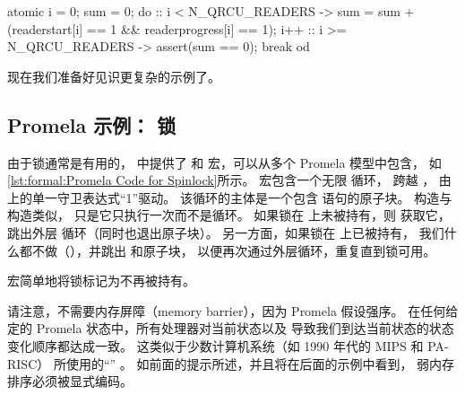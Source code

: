 \begin{listing}
\begin{VerbatimL}
atomic {
	i = 0;
	sum = 0;
	do
	:: i < N_QRCU_READERS ->
		sum = sum + (readerstart[i] == 1 &&
		             readerprogress[i] == 1);
		i++
	:: i >= N_QRCU_READERS ->
		assert(sum == 0);
		break
	od
}
\end{VerbatimL}
\caption{复杂 Promela 断言的原子块}
\label{lst:formal:Atomic Block for Complex Promela Assertion}
\end{listing}

现在我们准备好见识更复杂的示例了。

\subsection{Promela 示例：
			     锁}
\label{sec:formal:Promela Example: Locking}

\begin{fcvref}
由于锁通常是有用的， 中提供了  和
 宏，可以从多个 Promela 模型中包含，
如\cref{lst:formal:Promela Code for Spinlock}所示。
 宏包含一个无限  循环，
跨越 ，
由  上的单一守卫表达式``1''驱动。
该循环的主体是一个包含  语句的原子块。
 构造与  构造类似，
只是它只执行一次而不是循环。
如果锁在  上未被持有，则
 获取它，
 跳出外层  循环（同时也退出原子块）。
另一方面，如果锁在  上已被持有，
我们什么都不做（），并跳出  和原子块，
以便再次通过外层循环，重复直到锁可用。
\end{fcvref}

\begin{listing}

\caption{自旋锁（spinlock）的 Promela 代码}
\label{lst:formal:Promela Code for Spinlock}
\end{listing}

 宏简单地将锁标记为不再被持有。

请注意，不需要内存屏障（memory barrier），因为 Promela 假设强序。
在任何给定的 Promela 状态中，所有处理器对当前状态以及
导致我们到达当前状态的状态变化顺序都达成一致。
这类似于少数计算机系统（如 1990 年代的 MIPS 和 PA-RISC）
所使用的``''
。
如前面的提示所述，并且将在后面的示例中看到，
弱内存排序必须被显式编码。

